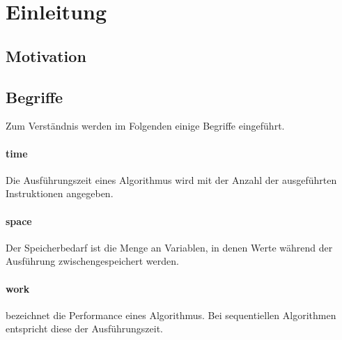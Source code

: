\section{Einleitung}

\subsection{Motivation}

\subsection{Begriffe}
Zum Verständnis werden im Folgenden einige Begriffe eingeführt.

\paragraph{time}
Die Ausführungszeit eines Algorithmus wird mit der Anzahl der ausgeführten Instruktionen angegeben.

\paragraph{space}
Der Speicherbedarf ist die Menge an Variablen, in denen Werte während der Ausführung zwischengespeichert werden.

\paragraph{work}
bezeichnet die Performance eines Algorithmus. Bei sequentiellen Algorithmen entspricht diese der Ausführungszeit.
